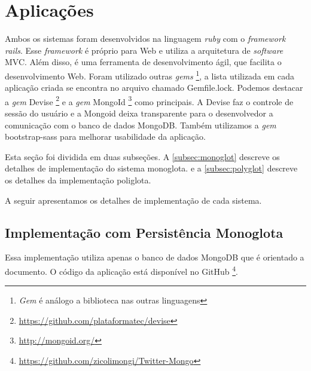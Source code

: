 \section{Aplicações}
\label{sec:applications}

Ambos os sistemas foram desenvolvidos na linguagem \textit{ruby} com o \textit{framework rails}. Esse \textit{framework} é próprio para Web e utiliza a arquitetura de \textit{software} \ac{MVC}. Além disso, é uma ferramenta de desenvolvimento ágil, que facilita o desenvolvimento Web.
Foram utilizado outras \textit{gems} \footnote{\textit{Gem} é análogo a biblioteca nas outras linguagens}, a lista utilizada em cada aplicação criada se encontra no arquivo chamado Gemfile.lock. Podemos destacar a \textit{gem} Devise \footnote{\url{https://github.com/plataformatec/devise}} e a \textit{gem} MongoId \footnote{\url{http://mongoid.org/}} como principais. A Devise faz o controle de sessão do usuário e a Mongoid deixa transparente para o desenvolvedor a comunicação com o banco de dados MongoDB. Também utilizamos a \textit{gem} bootstrap-sass para melhorar usabilidade da aplicação.

Esta seção foi dividida em duas subseções. A \autoref{subsec:monoglot} descreve os detalhes de implementação do sistema monoglota. e a \autoref{subsec:polyglot}  descreve os detalhes da implementação poliglota.

A seguir apresentamos os detalhes de implementação de cada sistema.

\subsection{Implementação com Persistência Monoglota}
\label{subsec:monoglot}

Essa implementação utiliza apenas o banco de dados MongoDB que é orientado a documento. O código da aplicação está disponível no GitHub \footnote{\url{https://github.com/zicolimongi/Twitter-Mongo}}.

